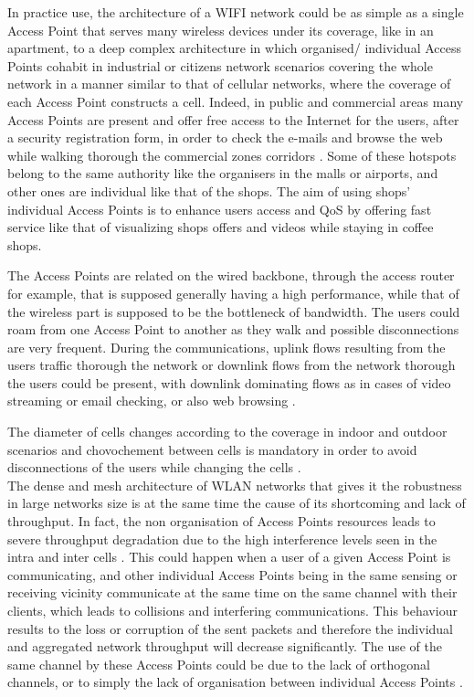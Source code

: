 \documentclass[journal,transmag]{IEEEtran}
\begin{document}
In practice use, the architecture of a WIFI network could be as simple as a single Access Point that serves many wireless devices under its coverage, like in an apartment, to a deep complex architecture in which organised/ individual Access Points cohabit in industrial or citizens network scenarios covering the whole network in a manner similar to that of cellular networks, where the coverage of each Access Point constructs a cell. 
Indeed, in public and commercial areas many Access Points are present and offer free access to the Internet for the users, after a security registration form, in order to check the e-mails and browse the web while walking thorough the commercial zones corridors \cite{16VALI_SDN}. Some of these hotspots belong to the same authority like the organisers in the malls or airports, and other ones are individual like that of the shops. The aim of using shops' individual Access Points is to enhance users access and QoS by offering fast service like that of visualizing shops offers and videos while staying in coffee shops. 

The Access Points are related on the wired backbone, through the access router for example, that is supposed generally having a high performance, while that of the wireless part is supposed to be the bottleneck of bandwidth. The users could roam from one Access Point to another as they walk and possible disconnections are very frequent. During the communications, uplink flows resulting from the users traffic thorough the network or downlink flows from the network thorough the users could be present, with downlink dominating flows as in cases of video streaming or email checking, or also web browsing \cite{05DIRAC}.    

The diameter of cells changes according to the coverage in indoor and outdoor scenarios and chovochement between cells is mandatory in order to avoid disconnections of the users while changing the cells \cite{15fuzzy_load_balancing_802.11}. \\

The dense and mesh architecture of WLAN networks that gives it the robustness in large networks size is at the same time the cause of its shortcoming and lack of throughput. In fact, the non organisation of Access Points resources leads to severe throughput degradation due to the high interference levels seen in the intra and inter cells \cite{15Node_throughput_enhencement_wifi}.
This could happen when a user of a given Access Point is communicating, and other individual Access Points being in the same sensing or receiving vicinity communicate at the same time on the same channel with their clients, which leads to collisions and interfering communications. This behaviour results to the loss or corruption of the sent packets and therefore the individual and aggregated network throughput will decrease significantly. The use of the same channel by these Access Points could be due to the lack of orthogonal channels, or to simply the lack of organisation between individual Access Points \cite{16AP_association_optimisation_fairness}. \\
\end{document}
